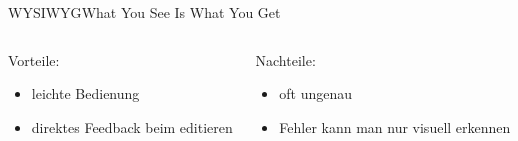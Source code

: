 \documentclass{setbeamer}
\begin{document}
\begin{frame}{WYSIWYG}{What You See Is What You Get}
    \pause
    \vspace{3mm}
    \begin{columns}
        \begin{column}{0.5\textwidth}
            Vorteile:
            \begin{itemize}
                \item leichte Bedienung
                \item direktes Feedback beim editieren
            \end{itemize}
        \end{column}

        \pause
        \begin{column}{0.5\textwidth}
            Nachteile:
            \begin{itemize}
                \item oft ungenau
                \item Fehler kann man nur visuell erkennen
            \end{itemize}
        \end{column}
    \end{columns}
\end{frame}
\end{document}
